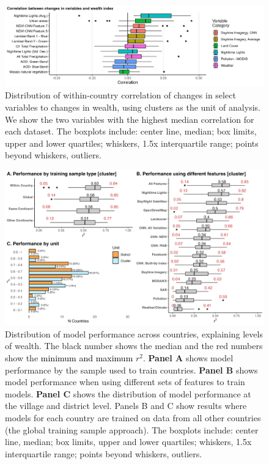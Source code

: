 \documentclass{article}
\begin{document}
\begin{figure}[H]
    \centering
    \includegraphics[width=1\textwidth]{figures/cor_changes.png}
    \caption{Distribution of within-country correlation of changes in select variables to changes in wealth, using clusters as the unit of analysis. We show the two variables with the highest median correlation for each dataset. The boxplots include: center line, median; box limits, upper and lower quartiles; whiskers, 1.5x interquartile range; points beyond whiskers, outliers.}
     \label{fig:cor_changes}
\end{figure}

\begin{figure}[H]
    \centering
    \includegraphics[width=1\textwidth]{figures/performence_country_avg_types.png}
    \caption{Distribution of model performance across countries, explaining levels of wealth. The black number shows the median and the red numbers show the \textcolor{black}{minimum and maximum} $r^2$. {\bf Panel A} shows model performance by the sample used to train countries. {\bf Panel B} shows model performance when using different sets of features to train models. {\bf Panel C} shows the distribution of model performance at the village and district level. Panels B and C show results where models for each country are trained on data from all other countries (the global training sample approach). The boxplots include: center line, median; box limits, upper and lower quartiles; whiskers, 1.5x interquartile range; points beyond whiskers, outliers.}
     \label{fig:performence_country_avg_types}
\end{figure}
\end{document}

